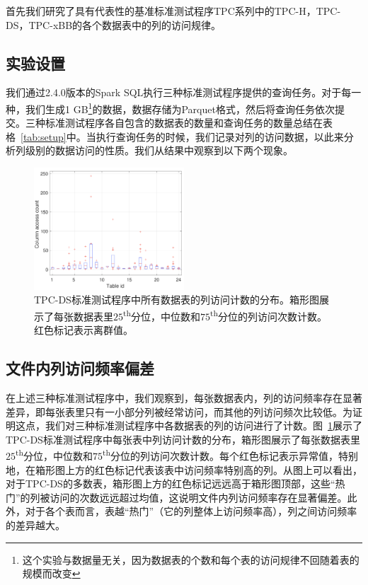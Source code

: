 \par 首先我们研究了具有代表性的基准标准测试程序TPC系列中的TPC-H，TPC-DS，TPC-xBB的各个数据表中的列的访问规律。

\subsection{实验设置}

\par 我们通过2.4.0版本的Spark SQL执行三种标准测试程序提供的查询任务。对于每一种，我们生成1 GB\footnote{这个实验与数据量无关，因为数据表的个数和每个表的访问规律不回随着表的规模而改变}的数据，数据存储为Parquet格式，然后将查询任务依次提交。三种标准测试程序各自包含的数据表的数量和查询任务的数量总结在表格~\ref{tab:setup}中。当执行查询任务的时候，我们记录对列的访问数据，以此来分析列级别的数据访问的性质。我们从结果中观察到以下两个现象。

\begin{figure}[t]
	\centering
	\includegraphics[width=0.5\textwidth]{img/motivation/column-pop}
	\caption{TPC-DS标准测试程序中所有数据表的列访问计数的分布。箱形图展示了每张数据表里$25$\textsuperscript{th}分位，中位数和$75$\textsuperscript{th}分位的列访问次数计数。红色标记表示离群值。}
	\label{fig:tpc-ds-column-pop}
\end{figure}

\subsection{文件内列访问频率偏差}

\par 在上述三种标准测试程序中，我们观察到，每张数据表内，列的访问频率存在显著差异，即每张表里只有一小部分列被经常访问，而其他的列访问频次比较低。为证明这点，我们对三种标准测试程序中各数据表的列的访问进行了计数。图~\ref{fig:tpc-ds-column-pop}展示了TPC-DS标准测试程序中每张表中列访问计数的分布，箱形图展示了每张数据表里$25$\textsuperscript{th}分位，中位数和$75$\textsuperscript{th}分位的列访问次数计数。每个红色标记表示异常值，特别地，在箱形图上方的红色标记代表该表中访问频率特别高的列。从图上可以看出，对于TPC-DS的多数表，箱形图上方的红色标记远远高于箱形图顶部，这些“热门”的列被访问的次数远远超过均值，这说明文件内列访问频率存在显著偏差。此外，对于各个表而言，表越“热门”（它的列整体上访问频率高），列之间访问频率的差异越大。

